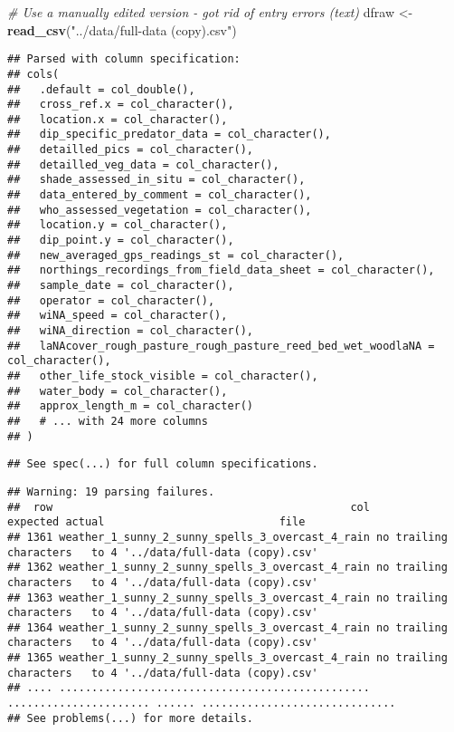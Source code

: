 \documentclass[]{article}
\newenvironment{Shaded}{\begin{snugshade}}{\end{snugshade}}
\newcommand{\CommentTok}[1]{\textcolor[rgb]{0.56,0.35,0.01}{\textit{#1}}}
\newcommand{\KeywordTok}[1]{\textcolor[rgb]{0.13,0.29,0.53}{\textbf{#1}}}
\newcommand{\NormalTok}[1]{#1}
\newcommand{\StringTok}[1]{\textcolor[rgb]{0.31,0.60,0.02}{#1}}
\begin{document}
\begin{Shaded}
\begin{Highlighting}[]
\CommentTok{# Use a manually edited version - got rid of entry errors (text)}
\NormalTok{dfraw <-}\StringTok{ }\KeywordTok{read_csv}\NormalTok{(}\StringTok{"../data/full-data (copy).csv"}\NormalTok{)}
\end{Highlighting}
\end{Shaded}

\begin{verbatim}
## Parsed with column specification:
## cols(
##   .default = col_double(),
##   cross_ref.x = col_character(),
##   location.x = col_character(),
##   dip_specific_predator_data = col_character(),
##   detailled_pics = col_character(),
##   detailled_veg_data = col_character(),
##   shade_assessed_in_situ = col_character(),
##   data_entered_by_comment = col_character(),
##   who_assessed_vegetation = col_character(),
##   location.y = col_character(),
##   dip_point.y = col_character(),
##   new_averaged_gps_readings_st = col_character(),
##   northings_recordings_from_field_data_sheet = col_character(),
##   sample_date = col_character(),
##   operator = col_character(),
##   wiNA_speed = col_character(),
##   wiNA_direction = col_character(),
##   laNAcover_rough_pasture_rough_pasture_reed_bed_wet_woodlaNA = col_character(),
##   other_life_stock_visible = col_character(),
##   water_body = col_character(),
##   approx_length_m = col_character()
##   # ... with 24 more columns
## )
\end{verbatim}

\begin{verbatim}
## See spec(...) for full column specifications.
\end{verbatim}

\begin{verbatim}
## Warning: 19 parsing failures.
##  row                                              col               expected actual                           file
## 1361 weather_1_sunny_2_sunny_spells_3_overcast_4_rain no trailing characters   to 4 '../data/full-data (copy).csv'
## 1362 weather_1_sunny_2_sunny_spells_3_overcast_4_rain no trailing characters   to 4 '../data/full-data (copy).csv'
## 1363 weather_1_sunny_2_sunny_spells_3_overcast_4_rain no trailing characters   to 4 '../data/full-data (copy).csv'
## 1364 weather_1_sunny_2_sunny_spells_3_overcast_4_rain no trailing characters   to 4 '../data/full-data (copy).csv'
## 1365 weather_1_sunny_2_sunny_spells_3_overcast_4_rain no trailing characters   to 4 '../data/full-data (copy).csv'
## .... ................................................ ...................... ...... ..............................
## See problems(...) for more details.
\end{verbatim}
\end{document}
